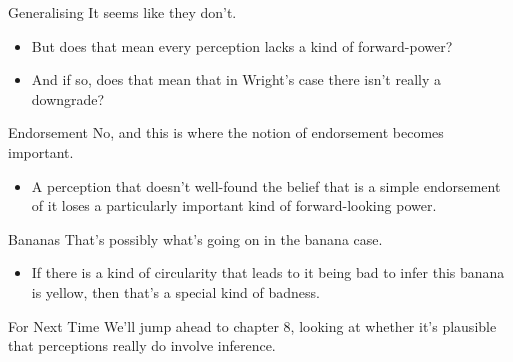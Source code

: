 \documentclass[
  17pt,
  letterpaper,
  ignorenonframetext,
  aspectratio=169,
  xcolor={dvipsnames}]{beamer}
\providecommand{\tightlist}{%
  \setlength{\itemsep}{0pt}\setlength{\parskip}{0pt}}\usepackage{longtable,booktabs,array}
\begin{document}
\begin{frame}{Generalising}
\protect\hypertarget{generalising-1}{}
It seems like they don't.

\begin{itemize}[<+->]
\tightlist
\item
  But does that mean every perception lacks a kind of forward-power?
\item
  And if so, does that mean that in Wright's case there isn't really a
  downgrade?
\end{itemize}
\end{frame}

\begin{frame}{Endorsement}
\protect\hypertarget{endorsement-2}{}
No, and this is where the notion of endorsement becomes important.

\begin{itemize}[<+->]
\tightlist
\item
  A perception that doesn't well-found the belief that is a simple
  endorsement of it loses a particularly important kind of
  forward-looking power.
\end{itemize}
\end{frame}

\begin{frame}{Bananas}
\protect\hypertarget{bananas}{}
That's possibly what's going on in the banana case.

\begin{itemize}[<+->]
\tightlist
\item
  If there is a kind of circularity that leads to it being bad to infer
  this banana is yellow, then that's a special kind of badness.
\end{itemize}
\end{frame}

\begin{frame}{For Next Time}
\protect\hypertarget{for-next-time}{}
We'll jump ahead to chapter 8, looking at whether it's plausible that
perceptions really do involve inference.
\end{frame}
\end{document}
